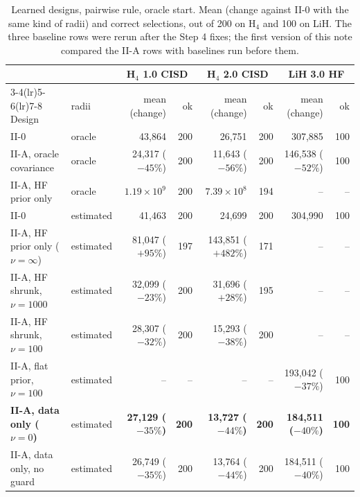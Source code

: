\documentclass[10.5pt]{article}
\newcommand{\sci}[2]{$#1\times10^{#2}$}
\begin{document}
\begin{table}[!ht]
\centering\small
\caption{Learned designs, pairwise rule, oracle start. Mean (change against II-0 with the same kind of radii) and correct selections, out of 200 on H$_4$ and 100 on LiH. The three baseline rows were rerun after the Step 4 fixes; the first version of this note compared the II-A rows with baselines run before them.}
\label{tab:step4}
\setlength{\tabcolsep}{3pt}
\begin{tabular}{llrrrrrr}
\toprule
 & & \multicolumn{2}{c}{H$_4$ 1.0 CISD} & \multicolumn{2}{c}{H$_4$ 2.0 CISD} & \multicolumn{2}{c}{LiH 3.0 HF} \\
\cmidrule(lr){3-4}\cmidrule(lr){5-6}\cmidrule(lr){7-8}
Design & radii & mean (change) & ok & mean (change) & ok & mean (change) & ok \\
\midrule
II-0 & oracle & 43,864 & 200 & 26,751 & 200 & 307,885 & 100 \\
II-A, oracle covariance & oracle & 24,317 ($-45\%$) & 200 & 11,643 ($-56\%$) & 200 & 146,538 ($-52\%$) & 100 \\
II-A, HF prior only & oracle & \sci{1.19}{9} & 200 & \sci{7.39}{8} & 194 & -- & -- \\
\midrule
II-0 & estimated & 41,463 & 200 & 24,699 & 200 & 304,990 & 100 \\
II-A, HF prior only ($\nu=\infty$) & estimated & 81,047 ($+95\%$) & 197 & 143,851 ($+482\%$) & 171 & -- & -- \\
II-A, HF shrunk, $\nu=1000$ & estimated & 32,099 ($-23\%$) & 200 & 31,696 ($+28\%$) & 195 & -- & -- \\
II-A, HF shrunk, $\nu=100$ & estimated & 28,307 ($-32\%$) & 200 & 15,293 ($-38\%$) & 200 & -- & -- \\
II-A, flat prior, $\nu=100$ & estimated & -- & -- & -- & -- & 193,042 ($-37\%$) & 100 \\
\textbf{II-A, data only ($\nu=0$)} & estimated & \textbf{27,129 ($-35\%$)} & \textbf{200} & \textbf{13,727 ($-44\%$)} & \textbf{200} & \textbf{184,511 ($-40\%$)} & \textbf{100} \\
II-A, data only, no guard & estimated & 26,749 ($-35\%$) & 200 & 13,764 ($-44\%$) & 200 & 184,511 ($-40\%$) & 100 \\
\bottomrule
\end{tabular}
\end{table}
\end{document}
